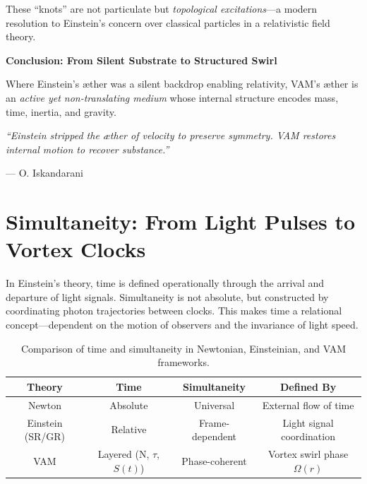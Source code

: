 \documentclass[preprint,notitlepage]{revtex4-2}
\begin{document}
    These “knots” are not particulate but \emph{topological excitations}—a modern resolution to Einstein’s concern over classical particles in a relativistic field theory.

    \vspace{0.5em}

    \noindent
    \textbf{Conclusion: From Silent Substrate to Structured Swirl}

    Where Einstein’s æther was a silent backdrop enabling relativity, VAM’s æther is an \textit{active yet non-translating medium} whose internal structure encodes mass, time, inertia, and gravity.

    \vspace{1em}
    \noindent
    \textit{“Einstein stripped the æther of velocity to preserve symmetry. VAM restores internal motion to recover substance.”}

    \hfill — O. Iskandarani

    \vspace{1em}
    \noindent

\section{Simultaneity: From Light Pulses to Vortex Clocks}


    In Einstein’s theory, time is defined operationally through the arrival and departure of light signals. Simultaneity is not absolute, but constructed by coordinating photon trajectories between clocks. This makes time a relational concept—dependent on the motion of observers and the invariance of light speed.

    \begin{table}[h!]
        \centering
        \begin{tabular}{|c|c|c|c|}
            \hline
            \textbf{Theory} & \textbf{Time} & \textbf{Simultaneity} & \textbf{Defined By} \\
            \hline
            Newton & Absolute & Universal & External flow of time \\
            Einstein (SR/GR) & Relative & Frame-dependent & Light signal coordination \\
            VAM & Layered (N, $\tau$, $S(t)$) & Phase-coherent & Vortex swirl phase $\Omega(r)$ \\
            \hline
        \end{tabular}
        \caption{Comparison of time and simultaneity in Newtonian, Einsteinian, and VAM frameworks.}
    \end{table}
\end{document}
